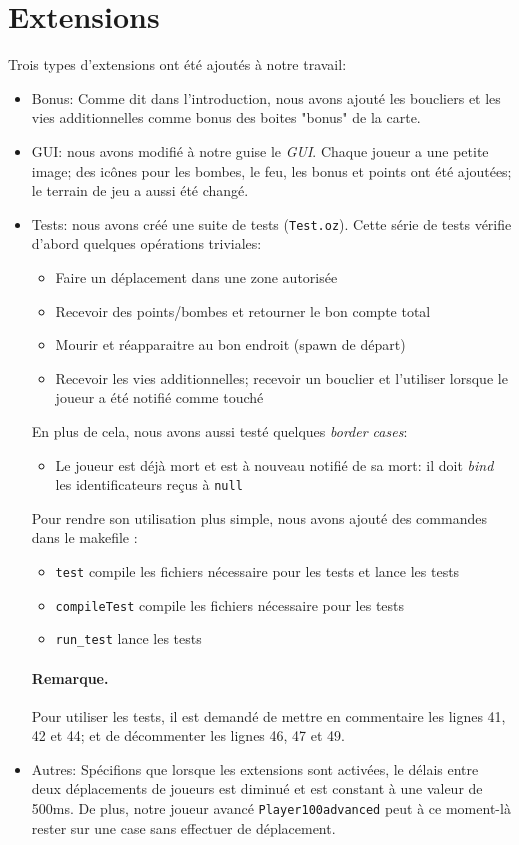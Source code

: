 \documentclass{article}
\begin{document}
\section{Extensions}
Trois types d'extensions ont été ajoutés à notre travail:
\begin{itemize}
	\item Bonus: Comme dit dans l'introduction, nous avons ajouté les boucliers et les vies additionnelles comme bonus des boites "bonus" de la carte.
	\item GUI: nous avons modifié à notre guise le \emph{GUI}. Chaque joueur a une petite image; des icônes pour les bombes, le feu, les bonus et points ont été ajoutées; le terrain de jeu a aussi été changé.
	\item Tests: nous avons créé une suite de tests (\texttt{Test.oz}). Cette série de tests vérifie d'abord quelques opérations triviales:
		\begin{itemize}
			\item Faire un déplacement dans une zone autorisée
			\item Recevoir des points/bombes et retourner le bon compte total
			\item Mourir et réapparaitre au bon endroit (spawn de départ)
			\item Recevoir les vies additionnelles; recevoir un bouclier et l'utiliser lorsque le joueur a été notifié comme touché
		\end{itemize}
	En plus de cela, nous avons aussi testé quelques \emph{border cases}:
		\begin{itemize}
			\item Le joueur est déjà mort et est à nouveau notifié de sa mort: il doit \emph{bind} les identificateurs reçus à \texttt{null}
			
		\end{itemize}
	Pour rendre son utilisation plus simple, nous avons ajouté des commandes dans le makefile :
	\begin{itemize}
		\item \texttt{test} compile les fichiers nécessaire pour les tests et lance les tests
		\item \texttt{compileTest} compile les fichiers nécessaire pour les tests
		\item \texttt{run\_test} lance les tests
	\end{itemize}
	\paragraph{Remarque.}Pour utiliser les tests, il est demandé de mettre en commentaire les lignes 41, 42 et 44; et de décommenter les lignes 46, 47 et 49.
	\item Autres: Spécifions que lorsque les extensions sont activées, le délais entre deux déplacements de joueurs est diminué et est constant à une valeur de 500ms. De plus, notre joueur avancé \texttt{Player100advanced} peut à ce moment-là rester sur une case sans effectuer de déplacement.
\end{itemize}
\end{document}
